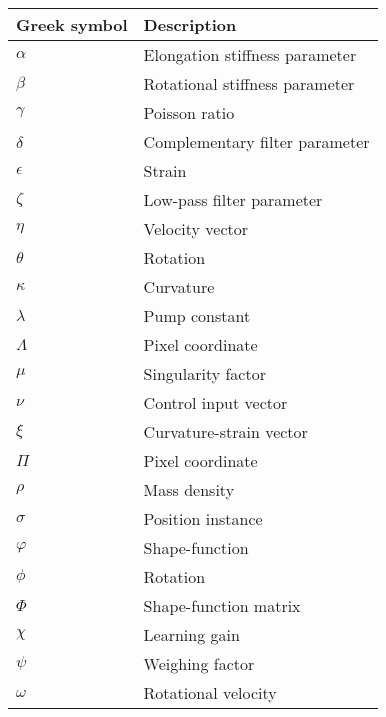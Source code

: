 \begin{spacing}{0.9}
\begin{multicols}{2}
\begin{table}[H]
\centering
    \begin{tabular}{p{2.5cm} p{3.4cm}} \hline
    \textbf{Greek symbol}    &   \textbf{Description }\\ \hline
    $\alpha$      & Elongation stiffness parameter  \\
    $\beta$       & Rotational stiffness parameter \\
    $\gamma$      & Poisson ratio \\
    $\delta$      & Complementary filter parameter \\
    $\epsilon$    & Strain \\
    $\zeta$       & Low-pass filter parameter \\
    $\eta$        & Velocity vector \\
    $\theta$      & Rotation \\
    $\kappa$      & Curvature \\
    $\lambda$     & Pump constant \\
    $\Lambda$     & Pixel coordinate \\
    $\mu$         & Singularity factor \\
    $\nu$         & Control input vector \\
    $\xi$         & Curvature-strain vector \\
    $\Pi$         & Pixel coordinate \\
    $\rho$        & Mass density \\
    $\sigma$      & Position instance \\
    $\varphi$     & Shape-function \\
    $\phi$        & Rotation  \\
    $\Phi$        & Shape-function matrix \\
    $\chi$        & Learning gain \\
    $\psi$        & Weighing factor \\
    $\omega$      &  Rotational velocity \\ \hline
    \end{tabular}
\end{table}



\end{multicols}
\end{spacing}
